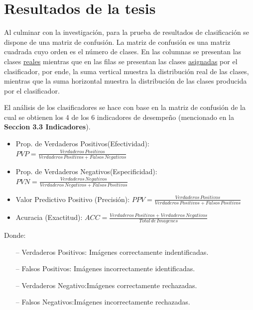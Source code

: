 \chapter{Resultados de la tesis}
\setcounter{page}{95}
\renewcommand{\baselinestretch}{1.2} %
	
	Al culminar con la investigación, para la prueba de resultados de clasificación se dispone de una matriz de confusión. La matriz de confusión es una matriz cuadrada cuyo orden es el número de clases. En las  columnas se presentan las clases \underline{reales} mientras que en las filas se presentan las clases \underline{asignadas} por el clasificador, por ende, la suma vertical muestra la distribución real de las clases, mientras que la suma horizontal muestra la distribución de las clases producida por el clasificador.

	El análisis de los clasificadores se hace con base en la matriz de confusión de la cual se obtienen los 4 de los 6 indicadores de desempeño (mencionado en la \textbf{Seccion 3.3 Indicadores}).

	\begin{itemize}

	\item Prop. de Verdaderos Positivos(Efectividad): {$PVP= \frac{Verdaderos\,Positivos}{{Verdaderos\,Positivos} + {Falsos\,Negativos}}$}
	\item Prop. de Verdaderos Negativos(Especificidad): {$PVN= \frac{Verdaderos\,Negativos}{{Verdaderos\,Negativos} + {Falsos\,Positivos}}$}
	\item Valor Predictivo Positivo (Precisión): {$PPV = \frac{Verdaderos\,Positivos}{{Verdaderos\,Positivos}+{Falsos\,Positivos}}$}
	\item Acuracia (Exactitud): {$ACC= \frac{Verdaderos\,Positivos+Verdaderos\,Negativos}{Total\,de\,Imagenes}$}
	\end{itemize}	
	Donde:
	\begin{itemize}
		\item[--] Verdaderos Positivos: Imágenes correctamente indentificadas.
		\item[--] Falsos Positivos: Imágenes incorrectamente identificadas.
		\item[--] Verdaderos Negativo:Imágenes correctamente rechazadas.
		\item[--] Falsos Negativos:Imágenes incorrectamente rechazadas.
	\end{itemize}
	
